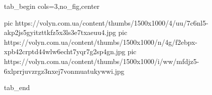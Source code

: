  
 
 
 
 


\ifcmt
  tab_begin cols=3,no_fig,center

     pic https://volyn.com.ua/content/thumbs/1500x1000/4/uu/7c6nl5-akp2js5gyitzttkfz5x3ls3e7txaeuu4.jpg
		 pic https://volyn.com.ua/content/thumbs/1500x1000/n/4g/f2ebpx-xpb42crptd44wlw6echt7yqr7g2sp4gn.jpg
		 pic https://volyn.com.ua/content/thumbs/1500x1000/i/ww/mfdjz5-6xlprrjuvzrgz3nxej7vonmuatukywwi.jpg

  tab_end
\fi
